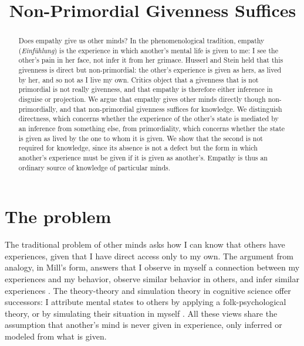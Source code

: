 \documentclass{situationist-preprint}
\title{Non-Primordial Givenness Suffices}
\begin{document}
\maketitle

\begin{abstract}
Does empathy give us other minds? In the phenomenological tradition, empathy (\emph{Einf\"uhlung}) is the experience in which another's mental life is given to me: I see the other's pain in her face, not infer it from her grimace. Husserl and Stein held that this givenness is direct but non-primordial: the other's experience is given as hers, as lived by her, and so not as I live my own. Critics object that a givenness that is not primordial is not really givenness, and that empathy is therefore either inference in disguise or projection. We argue that empathy gives other minds directly though non-primordially, and that non-primordial givenness suffices for knowledge. We distinguish directness, which concerns whether the experience of the other's state is mediated by an inference from something else, from primordiality, which concerns whether the state is given as lived by the one to whom it is given. We show that the second is not required for knowledge, since its absence is not a defect but the form in which another's experience must be given if it is given as another's. Empathy is thus an ordinary source of knowledge of particular minds.
\end{abstract}

\section{The problem}

The traditional problem of other minds asks how I can know that others have experiences, given that I have direct access only to my own. The argument from analogy, in Mill's form, answers that I observe in myself a connection between my experiences and my behavior, observe similar behavior in others, and infer similar experiences \citep{Mill1865}. The theory-theory and simulation theory in cognitive science offer successors: I attribute mental states to others by applying a folk-psychological theory, or by simulating their situation in myself \citep{Goldman2006}. All these views share the assumption that another's mind is never given in experience, only inferred or modeled from what is given.
\end{document}
